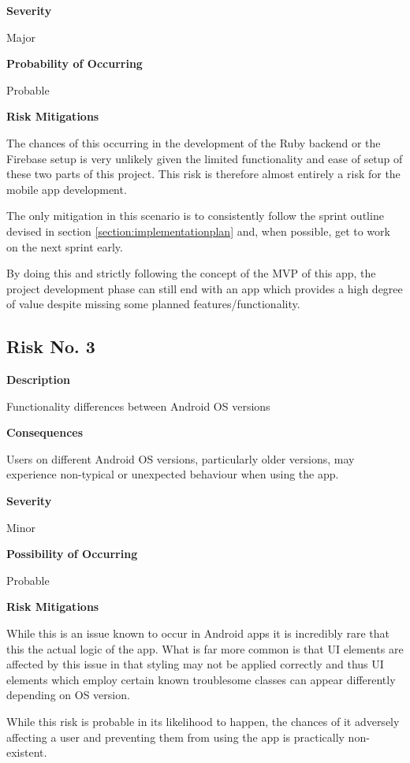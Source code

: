 \textbf{Severity}

Major

\textbf{Probability of Occurring}

Probable

\textbf{Risk Mitigations}

The chances of this occurring in the development of the Ruby backend or the Firebase setup is very unlikely given the limited functionality and ease of setup of these two parts of this project. This risk is therefore almost entirely a risk for the mobile app development.

The only mitigation in this scenario is to consistently follow the sprint outline devised in section \ref{section:implementationplan} and, when possible, get to work on the next sprint early.

By doing this and strictly following the concept of the MVP of this app, the project development phase can still end with an app which provides a high degree of value despite missing some planned features/functionality.

\subsection{Risk No. 3}

\textbf{Description}

Functionality differences between Android OS versions

\textbf{Consequences}

Users on different Android OS versions, particularly older versions, may experience non-typical or unexpected behaviour when using the app.

\textbf{Severity}

Minor

\textbf{Possibility of Occurring}

Probable

\textbf{Risk Mitigations}

While this is an issue known to occur in Android apps it is incredibly rare that this the actual logic of the app. What is far more common is that UI elements are affected by this issue in that styling may not be applied correctly and thus UI elements which employ certain known troublesome classes can appear differently depending on OS version.

While this risk is probable in its likelihood to happen, the chances of it adversely affecting  a user and preventing them from using the app is practically non-existent. 

